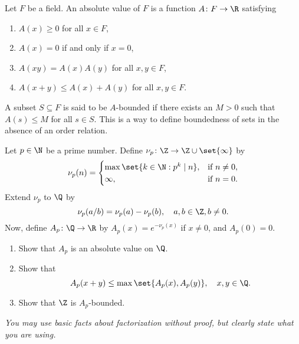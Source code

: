 \documentclass[12pt]{article}
\begin{document}
\begin{problem}
    Let $F$ be a field.
    An absolute value of $F$ is a function $A \colon F \to \R$ satisfying
    \begin{enumerate}[label=(\arabic*)]
        \item $A(x) \ge 0$ for all $x \in F$,
        \item $A(x) = 0$ if and only if $x = 0$,
        \item $A(xy) = A(x)A(y)$ for all $x, y \in F$,
        \item $A(x + y) \le A(x) + A(y)$ for all $x, y \in F$.
    \end{enumerate}
    A subset $S \subseteq F$ is said to be $A$-bounded if there exists an
    $M > 0$ such that $A(s) \le M$ for all $s \in S$.
    This is a way to define boundedness of sets in the absence of an order
    relation.

    Let $p \in \N$ be a prime number.
    Define $\nu_p \colon \Z \to \Z \cup \set{\infty}$ by \[
        \nu_p(n) = \begin{cases}
            \max\set{k \in \N : p^k \mid n}, & \text{if } n \ne 0, \\
            \infty, & \text{if } n = 0.
        \end{cases}
    \] Extend $\nu_p$ to $\Q$ by \[
        \nu_p(a/b) = \nu_p(a) - \nu_p(b), \quad a, b \in \Z, b \ne 0.
    \] Now, define $A_p \colon \Q \to \R$ by $A_p(x) = e^{-\nu_p(x)}$ if
    $x \ne 0$, and $A_p(0) = 0$.
    \begin{enumerate}[label=(\alph*)]
        \item Show that $A_p$ is an absolute value on $\Q$.
        \item Show that \[
            A_p(x + y) \le \max\set{A_p(x), A_p(y)}, \quad x, y \in \Q.
        \]
        \item Show that $\Z$ is $A_p$-bounded.
    \end{enumerate}
    \textit{You may use basic facts about factorization without proof,
    but clearly state what you are using.}
\end{problem}
\end{document}
